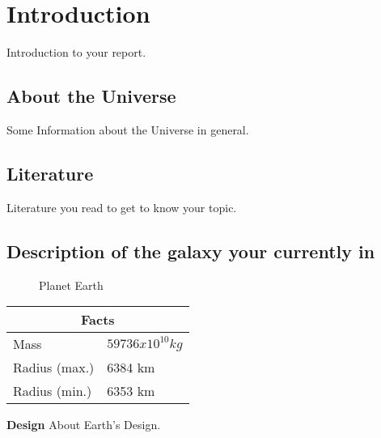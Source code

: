 
\chapter{Introduction}
Introduction to your report.

\section{About the Universe}
Some Information about the Universe in general.


\section{Literature} %

Literature you read to get to know your topic. 

\section{Description of the galaxy your currently in} %

\begin{figure}[H] 
\caption{Planet Earth}
\end{figure}

\begin{center}
  \begin{tabular}{| m{4.5cm} | m{12cm} |}
    \hline
    \multicolumn{2}{|c|}{Facts} \\ \hline
    Mass & \begin{math} 59736 x 10^{10} kg \end{math} \\ \hline
    Radius (max.) & 6384 km \\ \hline
    Radius (min.) & 6353 km \\ \hline
    \end{tabular}
  \end{center}

\textbf{Design}
About Earth's Design.

